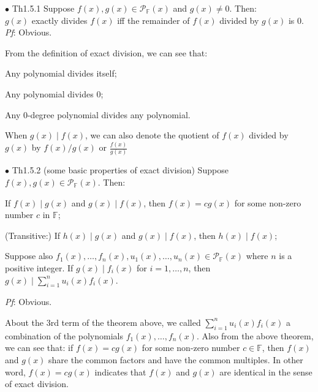 \documentclass{article}
\begin{document}
\begin{Th}{$\bullet$ Th1.5.1}
    Suppose $f(x), g(x)\in \mathcal{P}_\mathbb{F}(x)$ and $g(x)\neq 0$. Then:\\
    $g(x)$ exactly divides $f(x)$ iff the remainder of $f(x)$ divided by $g(x)$ is $0$.
    \tcblower
    \textit{Pf}: Obvious.
\end{Th}

\begin{Rmk}{}
    From the definition of exact division, we can see that: \textcolor{Th}{
    \begin{compactenum}
        \item Any polynomial divides itself;
        \item Any polynomial divides $0$;
        \item Any 0-degree polynomial divides any polynomial.
    \end{compactenum}}
    When $g(x)\mid f(x)$, \textcolor{Df}{we can also denote the quotient of $f(x)$ divided by $g(x)$ by $f(x)/g(x)$ or $\frac{f(x)}{g(x)}$}
\end{Rmk}

\begin{Th}{$\bullet$ Th1.5.2 (some basic properties of exact division)}
    Suppose $f(x), g(x)\in\mathcal{P}_\mathbb{F}(x)$. Then:
    \begin{compactenum}
        \item If $f(x)\mid g(x)$ and $g(x)\mid f(x)$, then $f(x) = cg(x)$ for some non-zero number $c$ in $\mathbb{F}$;
        \item (Transitive:) If $h(x)\mid g(x)$ and $g(x)\mid f(x)$, then $h(x)\mid f(x)$;
        \item Suppose also $f_1(x), \dots, f_n(x), u_1(x), \dots, u_n(x)\in \mathcal{P}_\mathbb{F}(x)$ where $n$ is a positive integer. If $g(x)\mid f_i(x)$ for $i=1,\dots,n$, then $g(x)\mid\sum_{i=1}^{n} u_i(x)f_i(x)$.
    \end{compactenum}
    \tcblower
    \textit{Pf}: Obvious.
\end{Th}

\begin{Rmk}{}
    \textcolor{Df}{About the 3rd term of the theorem above, we called $\sum_{i=1}^{n} u_i(x)f_i(x)$ a combination of the polynomials $f_1(x),\dots, f_n(x)$.}
    \textcolor{Th}{Also from the above theorem, we can see that: if $f(x) = cg(x)$ for some non-zero number $c\in\mathbb{F}$, then $f(x)$ and $g(x)$ share the common factors and have the common multiples. In other word, $f(x) = cg(x)$ indicates that $f(x)$ and $g(x)$ are identical in the sense of exact division.}
\end{Rmk}
\end{document}

